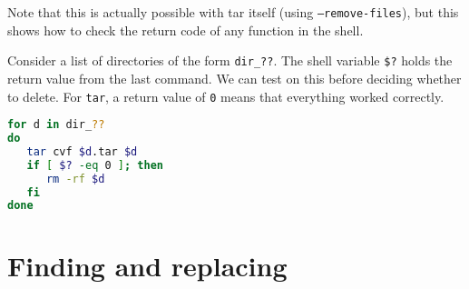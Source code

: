 Note that this is actually possible with tar itself (using {\tt --remove-files}), but this
shows how to check the return code of any function in the shell.

Consider a list of directories of the form {\tt dir\_??}.  The shell
variable {\tt \$?}  holds the return value from the last command.  We
can test on this before deciding whether to delete.  For {\tt tar}, a
return value of {\tt 0} means that everything worked correctly.

\begin{lstlisting}[language={bash},upquote=true]
for d in dir_??
do
   tar cvf $d.tar $d
   if [ $? -eq 0 ]; then
      rm -rf $d
   fi
done
\end{lstlisting}







\section{Finding and replacing}



